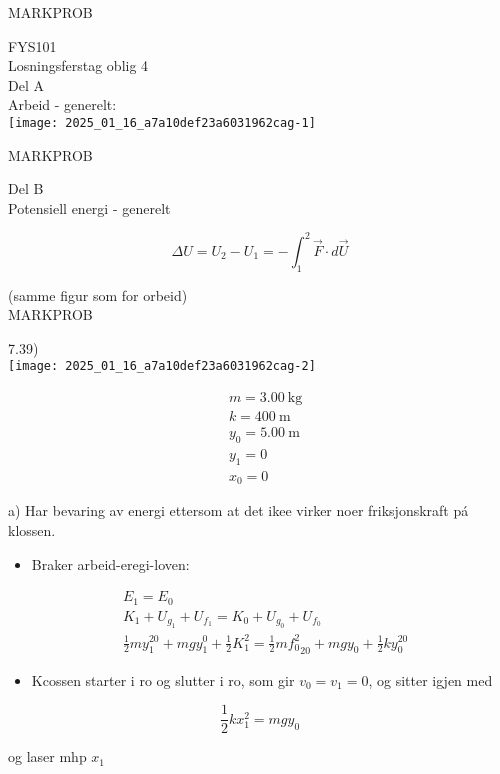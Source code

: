 \documentclass[10pt]{article}
\begin{document}
MARKPROB

FYS101\\
Losningsferstag oblig 4\\
Del A\\
Arbeid - generelt:\\
\texttt{[image: 2025\_01\_16\_a7a10def23a6031962cag-1]}

MARKPROB

Del B\\
Potensiell energi - generelt

$$
\Delta U=U_{2}-U_{1}=-\int_{1}^{2} \vec{F} \cdot d \vec{U}
$$

(samme figur som for orbeid)\\

MARKPROB

7.39)\\
\texttt{[image: 2025\_01\_16\_a7a10def23a6031962cag-2]}

$$
\begin{aligned}
& m=3.00 \mathrm{~kg} \\
& k=400 \mathrm{~m} \\
& y_{0}=5.00 \mathrm{~m} \\
& y_{1}=0 \\
& x_{0}=0
\end{aligned}
$$

a) Har bevaring av energi ettersom at det ikee virker noer friksjonskraft pá klossen.

\begin{itemize}
  \item Braker arbeid-eregi-loven:
\end{itemize}

$$
\begin{aligned}
& E_{1}=E_{0} \\
& K_{1}+U_{g_{1}}+U_{f_{1}}=K_{0}+U_{g_{0}}+U_{f_{0}} \\
& \frac{1}{2} m y_{1}^{20}+m g y_{1}^{0}+\frac{1}{2} K_{1}^{2}=\frac{1}{2} m{f_{0}^{2}}_{20}+m g y_{0}+\frac{1}{2} k y_{0}^{20}
\end{aligned}
$$

\begin{itemize}
  \item Kcossen starter i ro og slutter i ro, som gir $v_{0}=v_{1}=0$, og sitter igjen med
\end{itemize}

$$
\frac{1}{2} k x_{1}^{2}=m g y_{0}
$$

og laser mhp $x_{1}$
\end{document}
